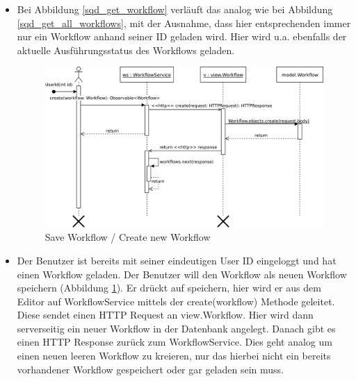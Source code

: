 \begin{itemize}
    
    \item     
    Bei Abbildung \ref{sqd_get_workflow} verläuft das analog wie bei Abbildung  \ref{sqd_get_all_workflows}, mit der Ausnahme, dass hier entsprechenden immer nur ein Workflow anhand seiner ID geladen wird. Hier wird u.a. ebenfalls der aktuelle Ausführungsstatus des Workflows geladen.\newline\newline
    
    \begin{figure}[H]
        \centering
        \includegraphics[width=15cm]{images/sqd_save_workflow.jpeg}
        \caption{Save Workflow / Create new Workflow}
        \label{sqd_save_workflow}
    \end{figure}

    \item Der Benutzer ist bereits mit seiner eindeutigen User ID eingeloggt und hat einen Workflow geladen. Der Benutzer will den Workflow als neuen Workflow speichern (Abbildung \ref{sqd_save_workflow}). Er drückt auf \grqq{}speichern\grqq{}, hier wird er aus dem Editor auf WorkflowService mittels der create(workflow) Methode geleitet. Diese sendet einen HTTP Request an view.Workflow. Hier wird dann serverseitig ein neuer Workflow in der Datenbank angelegt. Danach gibt es einen HTTP Response zurück zum WorkflowService. Dies geht analog um einen neuen leeren Workflow zu kreieren, nur das hierbei nicht ein bereits vorhandener Workflow gespeichert oder gar geladen sein muss. \newline\newline
    

\end{itemize}
